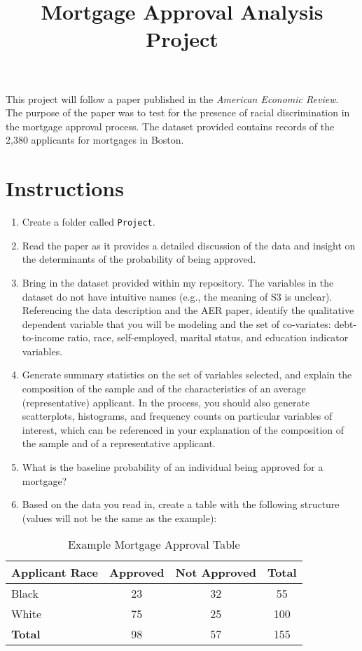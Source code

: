\documentclass{article}
\begin{document}
\title{Mortgage Approval Analysis Project}
\author{}
\date{}
\maketitle

This project will follow a paper published in the \textit{American Economic Review}. The purpose of the paper was to test for the presence of racial discrimination in the mortgage approval process. The dataset provided contains records of the 2,380 applicants for mortgages in Boston.

\section*{Instructions}
\begin{enumerate}
    \item Create a folder called \texttt{Project}.
    \item Read the paper as it provides a detailed discussion of the data and insight on the determinants of the probability of being approved.
    \item Bring in the dataset provided within my repository. The variables in the dataset do not have intuitive names (e.g., the meaning of S3 is unclear). Referencing the data description and the AER paper, identify the qualitative dependent variable that you will be modeling and the set of co-variates: debt-to-income ratio, race, self-employed, marital status, and education indicator variables.

    \item Generate summary statistics on the set of variables selected, and explain the composition of the sample and of the characteristics of an average (representative) applicant. In the process, you should also generate scatterplots, histograms, and frequency counts on particular variables of interest, which can be referenced in your explanation of the composition of the sample and of a representative applicant.
    \item What is the baseline probability of an individual being approved for a mortgage?
    \item Based on the data you read in, create a table with the following structure (values will not be the same as the example):
\end{enumerate}

\begin{table}[h]
    \centering
    \begin{tabular}{lccc}
        \toprule
        \textbf{Applicant Race} & \textbf{Approved} & \textbf{Not Approved} & \textbf{Total} \\
        \midrule
        Black & 23 & 32 & 55 \\
        White & 75 & 25 & 100 \\
        \midrule
        \textbf{Total} & 98 & 57 & 155 \\
        \bottomrule
    \end{tabular}
    \caption{Example Mortgage Approval Table}
\end{table}
\end{document}
